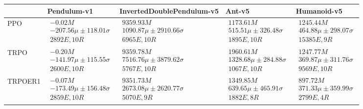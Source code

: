 \begin{tabular}{|l|p{3.2cm}|p{3.2cm}|p{3.2cm}|p{3.2cm}|}
\toprule
 & Pendulum-v1 & InvertedDoublePendulum-v5 & Ant-v5 & Humanoid-v5 \\
\midrule
PPO & $\begin{array}{c} -0.02M \\ -207.56\mu \pm 118.01\sigma \\ 2892E, 10R \end{array}$ & $\begin{array}{c} 9359.93M \\ 1090.87\mu \pm 2910.66\sigma \\ 6965E, 10R \end{array}$ & $\begin{array}{c} 1173.61M \\ 515.51\mu \pm 326.48\sigma \\ 1895E, 10R \end{array}$ & $\begin{array}{c} 1245.44M \\ 464.88\mu \pm 298.07\sigma \\ 15385E, 9R \end{array}$ \\  \hline
TRPO & $\begin{array}{c} -0.20M \\ -141.97\mu \pm 115.55\sigma \\ 2600E, 10R \end{array}$ & $\begin{array}{c} 9359.78M \\ 7516.76\mu \pm 3879.62\sigma \\ 5767E, 10R \end{array}$ & $\begin{array}{c} 1960.61M \\ 1328.68\mu \pm 284.88\sigma \\ 1067E, 10R \end{array}$ & $\begin{array}{c} 1247.77M \\ 369.87\mu \pm 311.76\sigma \\ 9569E, 10R \end{array}$ \\  \hline
TRPOER1 & $\begin{array}{c} -0.07M \\ -173.49\mu \pm 156.48\sigma \\ 2859E, 10R \end{array}$ & $\begin{array}{c} 9351.73M \\ 2673.08\mu \pm 2620.77\sigma \\ 5070E, 9R \end{array}$ & $\begin{array}{c} 1349.85M \\ 639.65\mu \pm 465.91\sigma \\ 1882E, 8R \end{array}$ & $\begin{array}{c} 897.72M \\ 371.33\mu \pm 359.99\sigma \\ 2799E, 4R \end{array}$ \\  \hline

\end{tabular}
